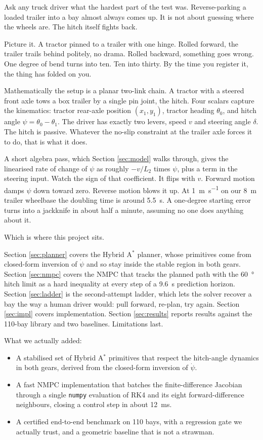 \documentclass[conference]{IEEEtran}
\begin{document}
Ask any truck driver what the hardest part of the test was.
Reverse-parking a loaded trailer into a bay almost always comes up. It is
not about guessing where the wheels are. The hitch itself fights back.

Picture it. A tractor pinned to a trailer with one hinge. Rolled forward,
the trailer trails behind politely, no drama. Rolled backward, something
goes wrong. One degree of bend turns into ten. Ten into thirty. By the
time you register it, the thing has folded on you.

Mathematically the setup is a planar two-link chain. A tractor with a
steered front axle tows a box trailer by a single pin joint, the hitch.
Four scalars capture the kinematics: tractor rear-axle position
$(x_1, y_1)$, tractor heading $\theta_0$, and hitch angle $\psi = \theta_0
- \theta_1$. The driver has exactly two levers, speed $v$ and steering
angle $\delta$. The hitch is passive. Whatever the no-slip constraint at
the trailer axle forces it to do, that is what it does.

A short algebra pass, which Section \ref{sec:model} walks through, gives
the linearised rate of change of $\psi$ as roughly $-v/L_2$ times $\psi$,
plus a term in the steering input. Watch the sign of that coefficient.
It flips with $v$. Forward motion damps $\psi$ down toward zero. Reverse
motion blows it up. At \SI{1}{\meter\per\second} on our \SI{8}{\meter}
trailer wheelbase the doubling time is around \SI{5.5}{\second}. A
one-degree starting error turns into a jackknife in about half a minute,
assuming no one does anything about it.

Which is where this project sits.

Section \ref{sec:planner} covers the Hybrid A$^{*}$ planner, whose
primitives come from closed-form inversion of $\dot{\psi}$ and so stay
inside the stable region in both gears. Section \ref{sec:nmpc} covers the
NMPC that tracks the planned path with the \SI{60}{\degree} hitch limit
as a hard inequality at every step of a \SI{9.6}{\second} prediction
horizon. Section \ref{sec:ladder} is the second-attempt ladder, which
lets the solver recover a bay the way a human driver would: pull forward,
re-plan, try again. Section \ref{sec:impl} covers implementation.
Section \ref{sec:results} reports results against the 110-bay library
and two baselines. Limitations last.

What we actually added:
\begin{itemize}
    \item A stabilised set of Hybrid A$^{*}$ primitives that respect the
          hitch-angle dynamics in both gears, derived from the closed-form
          inversion of $\dot{\psi}$.
    \item A fast NMPC implementation that batches the finite-difference
          Jacobian through a single \texttt{numpy} evaluation of RK4 and
          its eight forward-difference neighbours, closing a control step
          in about \SI{12}{\milli\second}.
    \item A certified end-to-end benchmark on 110 bays, with a regression
          gate we actually trust, and a geometric baseline that is not a
          strawman.
\end{itemize}
\end{document}
